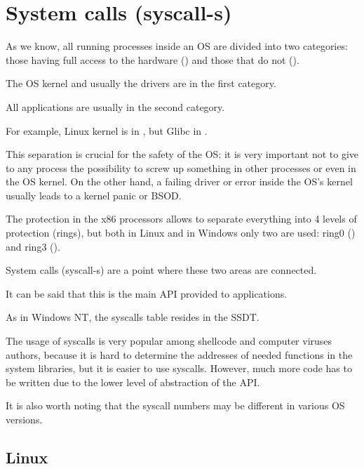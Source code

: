\section{System calls (syscall-s)}

\label{syscalls}

As we know, all running processes inside an \ac{OS} are divided into two categories:
those having full access to the hardware () 
and those that do not ().

The \ac{OS} kernel and usually the drivers are in the first category.

All applications are usually in the second category.

For example, Linux kernel is in , but Glibc in .

This separation is crucial for the safety of the \ac{OS}: it is very important not to give to any process the possibility to screw up
something in other processes or even in the \ac{OS} kernel.
On the other hand, a failing driver or error inside the \ac{OS}'s kernel usually leads to a kernel panic or \ac{BSOD}.

The protection in the x86 processors allows to separate everything into 4 levels of protection (rings), but both in Linux
and in Windows only two are used: ring0 () and ring3 ().

System calls (syscall-s)
are a point where these two areas are connected.

It can be said that this is the main \ac{API} provided to applications.

As in \gls{Windows NT}, the syscalls table resides in the \ac{SSDT}.


The usage of syscalls is very popular among shellcode and computer viruses authors, 
because it is hard to determine the addresses of
needed functions in the system libraries, but it is easier to use syscalls. However, much more code has to be
written due to the lower level of abstraction of the \ac{API}.

It is also worth noting that the syscall numbers may be different in various OS versions.

\subsection{Linux}
\label{linux_syscall}


